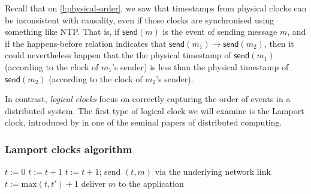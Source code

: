 Recall that on \autoref{l:physical-order}, we saw that timestamps from physical clocks can be inconsistent with causality, even if those clocks are synchronised using something like NTP.
That is, if $\mathsf{send}(m)$ is the event of sending message $m$, and if the happens-before relation indicates that $\mathsf{send}(m_1) \rightarrow \mathsf{send}(m_2)$, then it could nevertheless happen that the the physical timestamp of $\mathsf{send}(m_1)$ (according to the clock of $m_1$'s sender) is less than the physical timestamp of $\mathsf{send}(m_2)$ (according to the clock of $m_2$'s sender).

In contrast, \emph{logical clocks} focus on correctly capturing the order of events in a distributed system.
The first type of logical clock we will examine is the Lamport clock, introduced by \citet{Lamport:1978} in one of the seminal papers of distributed computing.

\begin{frame}
    \label{s:lamport-definition}
    \frametitle{Lamport clocks algorithm}
    \begin{algorithmic}
            \State $t := 0$ 
        \EndOn
        \State
            \State $t := t + 1$
        \EndOn
        \State
            \State $t := t + 1$; send $(t, m)$ via the underlying network link
        \EndOn
        \State
            \State $t := \mathrm{max}(t, t') + 1$
            \State deliver $m$ to the application
        \EndOn
    \end{algorithmic}
\end{frame}
\label{l:lamport-definition}

